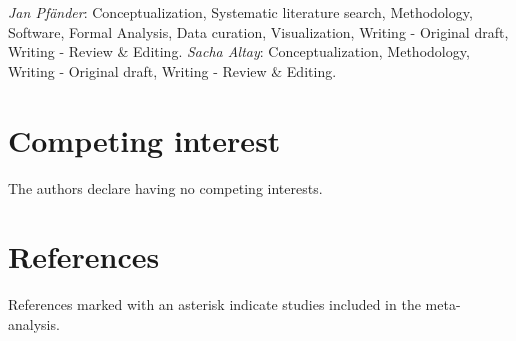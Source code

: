 \documentclass[
  man]{apa6}
\begin{document}
\emph{Jan Pfänder}: Conceptualization, Systematic literature search, Methodology, Software, Formal Analysis, Data curation, Visualization, Writing - Original draft, Writing - Review \& Editing. \emph{Sacha Altay}: Conceptualization, Methodology, Writing - Original draft, Writing - Review \& Editing.

\section{Competing interest}\label{competing-interest}

The authors declare having no competing interests.

\FloatBarrier

\newpage

\section{References}\label{references}

\begingroup
\setlength{\parindent}{-0.5in}
\setlength{\leftskip}{0.5in}

References marked with an asterisk indicate studies included in the meta-analysis.
\end{document}
